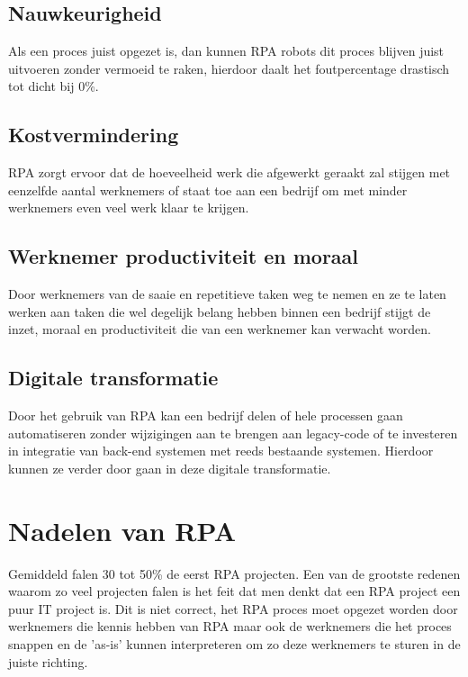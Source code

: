 \autocite{efficiencyRPA}
\subsection{Nauwkeurigheid}
Als een proces juist opgezet is, dan kunnen RPA robots dit proces blijven juist uitvoeren zonder vermoeid te raken, hierdoor daalt het foutpercentage drastisch tot dicht bij 0\%. \autocite{efficiencyRPA}

\subsection{Kostvermindering}
RPA zorgt ervoor dat de hoeveelheid werk die afgewerkt geraakt zal stijgen met eenzelfde aantal werknemers of staat toe aan een bedrijf om met minder werknemers even veel werk klaar te krijgen. \autocite{efficiencyRPA}

\subsection{Werknemer productiviteit en moraal}
Door werknemers van de saaie en repetitieve taken weg te nemen en ze te laten werken aan taken die wel degelijk belang hebben binnen een bedrijf stijgt de inzet, moraal en productiviteit die van een werknemer kan verwacht worden. \autocite{efficiencyRPA}

\subsection{Digitale transformatie}
Door het gebruik van RPA kan een bedrijf delen of hele processen gaan automatiseren zonder wijzigingen aan te brengen aan legacy-code of te investeren in integratie van back-end systemen met reeds bestaande systemen. Hierdoor kunnen ze verder door gaan in deze digitale transformatie. \autocite{efficiencyRPA}

\section{Nadelen van RPA}
Gemiddeld falen 30 tot 50\% de eerst RPA projecten. \autocite{everythingRPA} Een van de grootste redenen waarom zo veel projecten falen is het feit dat men denkt dat een RPA project een puur IT project is. Dit is niet correct, het RPA proces moet opgezet worden door werknemers die kennis hebben van RPA maar ook de werknemers die het proces snappen en de 'as-is' kunnen interpreteren om zo deze werknemers te sturen in de juiste richting.

